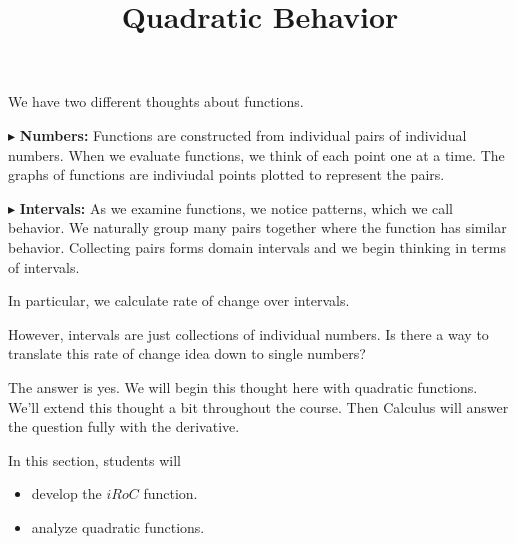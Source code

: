 \documentclass{ximera}
\title{Quadratic Behavior}
\begin{document}
\begin{abstract}
\end{abstract}
\maketitle







We have two different thoughts about functions.


$\blacktriangleright$ \textbf{Numbers:}  Functions are constructed from individual pairs of individual numbers.  When we evaluate functions, we think of each point one at a time.  The graphs of functions are indiviudal points plotted to represent the pairs. 







$\blacktriangleright$ \textbf{Intervals:} As we examine functions, we notice patterns, which we call behavior. We naturally group many pairs together where the function has similar behavior.  Collecting pairs forms domain intervals and we begin thinking in terms of intervals.





In particular, we calculate rate of change over intervals. 


However, intervals are just collections of individual numbers.  Is there a way to translate this rate of change idea down to single numbers?

The answer is yes.  We will begin this thought here with quadratic functions. We'll extend this thought a bit throughout the course. Then Calculus will answer the question fully with the derivative.















\begin{sectionOutcomes}
In this section, students will 

\begin{itemize}
\item develop the $iRoC$ function.
\item analyze quadratic functions.
\end{itemize}
\end{sectionOutcomes}
\end{document}
